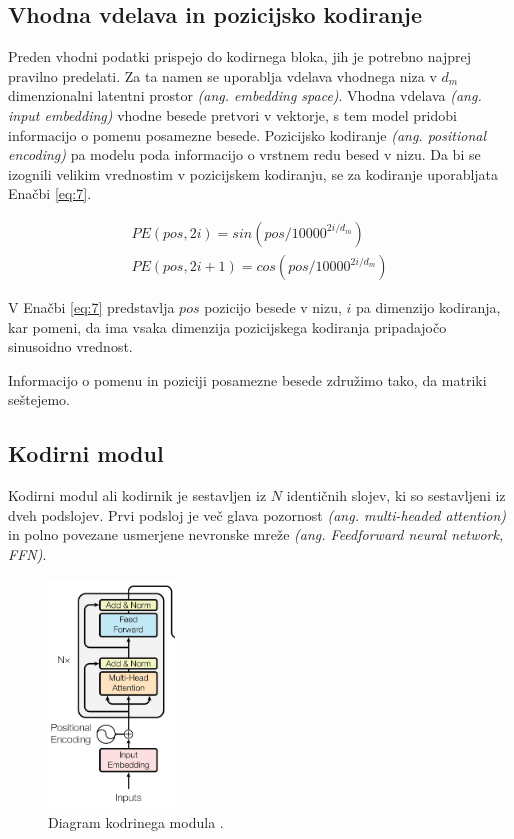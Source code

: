 \documentclass[a4paper,12pt,openright]{book}
\begin{document}
\subsection{Vhodna vdelava in pozicijsko kodiranje}
Preden vhodni podatki prispejo do kodirnega bloka, jih je potrebno najprej pravilno predelati. Za ta namen se uporablja vdelava vhodnega niza v $ d_m $ dimenzionalni latentni prostor \emph{(ang. embedding space)}. Vhodna vdelava \emph{(ang. input embedding)} vhodne besede pretvori v vektorje, s tem model pridobi informacijo o pomenu posamezne besede. Pozicijsko kodiranje \emph{(ang. positional encoding)} pa modelu poda informacijo o vrstnem redu besed v nizu. Da bi se izognili velikim vrednostim v pozicijskem kodiranju, se za kodiranje uporabljata Enačbi \ref{eq:7}.

\begin{equation}
    \begin{split}
        PE(pos, 2i) = sin(pos/10000^{2i/d_m}) \\
        PE(pos, 2i+1) = cos(pos/10000^{2i/d_m})
    \end{split}
    \label{eq:7}
\end{equation}

V Enačbi \ref{eq:7} predstavlja $ pos $ pozicijo besede v nizu, $ i $ pa dimenzijo kodiranja, kar pomeni, da ima vsaka dimenzija pozicijskega kodiranja pripadajočo sinusoidno vrednost.


Informacijo o pomenu in poziciji posamezne besede združimo tako, da matriki seštejemo.

\subsection{Kodirni modul}
Kodirni modul ali kodirnik je sestavljen iz $ N $ identičnih slojev, ki so sestavljeni iz dveh podslojev. Prvi podsloj je več glava pozornost \emph{(ang. multi-headed attention)} in polno povezane usmerjene nevronske mreže \emph{(ang. Feedforward neural network, FFN)}.

\begin{figure}[htb]
    \begin{center}
        \includegraphics[width=0.3\textwidth]{img/encoder.png}
    \end{center}
    \caption{Diagram kodrinega modula \cite{attention_is_all_you_need}.}
    \label{img:encoder}
\end{figure}
\end{document}
